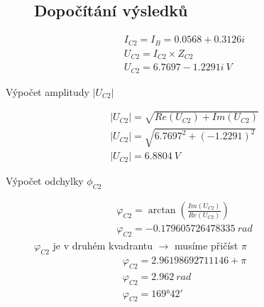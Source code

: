 \begin{figure}[h!]
    \subsection*{Dopočítání výsledků}
    \begin{gather*}
        I_{C2} = I_B = 0.0568 + 0.3126i \\
        U_{C2} = I_{C2} \times Z_{C2} \\ 
        U_{C2} = 6.7697 - 1.2291i \: V
    \end{gather*}
\end{figure}
Výpočet amplitudy $|U_{C2}|$
\begin{figure}[h!]
    \begin{gather*}
        |U_{C2}| = \sqrt{Re(U_{C2}) + Im(U_{C2})} \\
        |U_{C2}| = \sqrt{6.7697^2 + (- 1.2291)^2} \\
        |U_{C2}| = 6.8804 \: V
    \end{gather*}
\end{figure}
Výpočet odchylky $\phi_{C2}$
\begin{figure}[h!]
    \begin{gather*}
       \varphi_{C2} = \arctan(\frac{Im(U_{C2})}{Re(U_{C2})}) \\
       \varphi_{C2} = -0.179605726478335 \: rad
    \end{gather*}
    $\varphi_{C2}$ je v druhém kvadrantu $\rightarrow$ musíme přičíst $\pi$ 
    \begin{gather*}
        \varphi_{C2} = 2.96198692711146 + \pi \\
        \varphi_{C2} = 2.962 \: rad \\
        \varphi_{C2} = \ang{169;42;}
     \end{gather*}
\end{figure}

\clearpage